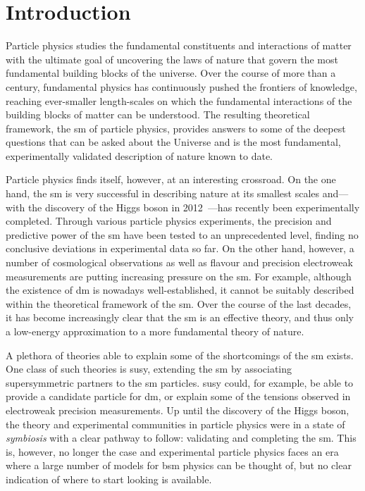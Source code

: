 
\chapter*{Introduction}

       
Particle physics studies the fundamental constituents and interactions of matter with the ultimate goal of uncovering the laws of nature that govern the most fundamental building blocks of the universe.
Over the course of more than a century, fundamental physics has continuously pushed the frontiers of knowledge, reaching ever-smaller length-scales on which the fundamental interactions of the building blocks of matter can be understood.
The resulting theoretical framework, the \gls{sm} of particle physics, provides answers to some of the deepest questions that can be asked about the Universe and is the most fundamental, experimentally validated description of nature known to date. 

Particle physics finds itself, however, at an interesting crossroad. On the one hand, the \gls{sm} is very successful in describing nature at its smallest scales and---with the discovery of the Higgs boson in 2012~\cite{HIGG-2012-27,CMS-HIG-12-028}---has recently been experimentally completed.
Through various particle physics experiments, the precision and predictive power of the \gls{sm} have been tested to an unprecedented level, finding no conclusive deviations in experimental data so far.
On the other hand, however, a number of cosmological observations as well as flavour and precision electroweak measurements are putting increasing pressure on the \gls{sm}.
For example, although the existence of \gls{dm} is nowadays well-established, it cannot be suitably described within the theoretical framework of the \gls{sm}.
Over the course of the last decades, it has become increasingly clear that the \gls{sm} is an effective theory, and thus only a low-energy approximation to a more fundamental theory of nature.

A plethora of theories able to explain some of the shortcomings of the \gls{sm} exists. One class of such theories is \gls{susy}, extending the \gls{sm} by associating supersymmetric partners to the \gls{sm} particles.
\gls{susy} could, for example, be able to provide a candidate particle for \gls{dm}, or explain some of the tensions observed in electroweak precision measurements.
Up until the discovery of the Higgs boson, the theory and experimental communities in particle physics were in a state of \textit{symbiosis} with a clear pathway to follow: validating and completing the \gls{sm}. This is, however, no longer the case and experimental particle physics faces an era where a large number of models for \gls{bsm} physics can be thought of, but no clear indication of where to start looking is available. 

